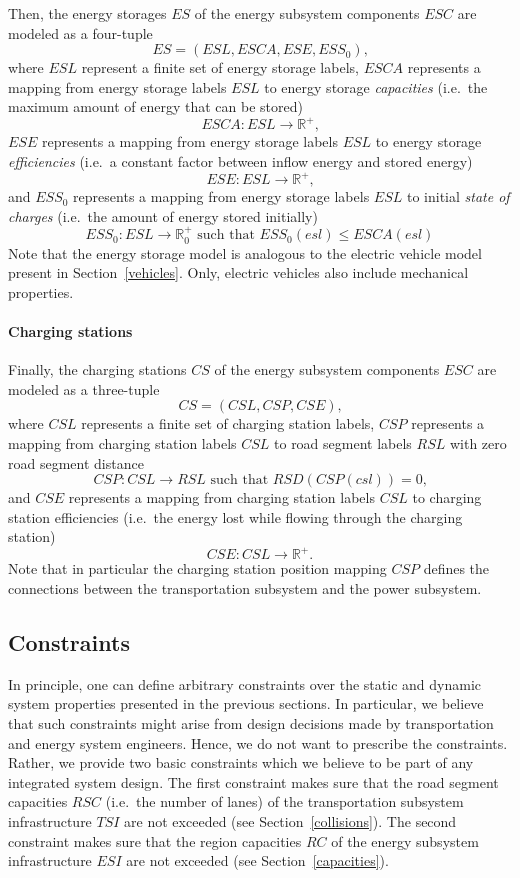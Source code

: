 Then, the energy storages $ES$ of the energy subsystem components $ESC$ are modeled as a four-tuple
\[
	ES = (ESL, ESCA, ESE, ESS_0) \textrm{,}
\]
where $ESL$ represent a finite set of energy storage labels, $ESCA$ represents a mapping from energy storage labels $ESL$ to energy storage \textit{capacities} (i.e.\ the maximum amount of energy that can be stored)
\[
	ESCA: ESL \rightarrow \mathbb{R}^+ \textrm{,}
\]
$ESE$ represents a mapping from energy storage labels $ESL$ to energy storage \textit{efficiencies} (i.e.\ a constant factor between inflow energy and stored energy)
\[
	ESE: ESL \rightarrow \mathbb{R}^+ \textrm{,}
\]
and $ESS_0$ represents a mapping from energy storage labels $ESL$ to initial \textit{state of charges} (i.e.\ the amount of energy stored initially)
\[
	ESS_0: ESL \rightarrow \mathbb{R}_0^+ \textrm{ such that } ESS_0(esl) \leq ESCA(esl)
\]
Note that the energy storage model is analogous to the electric vehicle model present in Section~\ref{vehicles}. Only, electric vehicles also include mechanical properties.


\paragraph{Charging stations}
\label{charging_stations}

Finally, the charging stations $CS$ of the energy subsystem components $ESC$ are modeled as a three-tuple
\[
	CS = (CSL, CSP, CSE) \textrm{,}
\]
where $CSL$ represents a finite set of charging station labels, $CSP$ represents a mapping from charging station labels $CSL$ to road segment labels $RSL$ with zero road segment distance
\[
	CSP: CSL \rightarrow RSL \textrm{ such that } RSD(CSP(csl)) = 0 \textrm{,}
\]
and $CSE$ represents a mapping from charging station labels $CSL$ to charging station efficiencies (i.e.\ the energy lost while flowing through the charging station)
\[
	CSE: CSL \rightarrow \mathbb{R}^+ \textrm{.}
\]
Note that in particular the charging station position mapping $CSP$ defines the connections between the transportation subsystem and the power subsystem.


\subsection{Constraints}
\label{constraints}

In principle, one can define arbitrary constraints over the static and dynamic system properties presented in the previous sections. In particular, we believe that such constraints might arise from design decisions made by transportation and energy system engineers. Hence, we do not want to prescribe the constraints. Rather, we provide two basic constraints which we believe to be part of any integrated system design. The first constraint makes sure that the road segment capacities $RSC$ (i.e.\ the number of lanes) of the transportation subsystem infrastructure $TSI$ are not exceeded (see Section~\ref{collisions}). The second constraint makes sure that the region capacities $RC$ of the energy subsystem infrastructure $ESI$ are not exceeded (see Section~\ref{capacities}).

